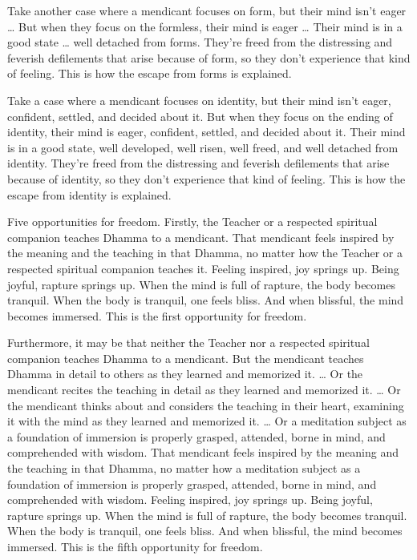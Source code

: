 \documentclass[12pt,openany]{book}%
\begin{document}
Take another case where a mendicant focuses on form, but their mind isn’t eager … But when they focus on the formless, their mind is eager … Their mind is in a good state … well detached from forms. They’re freed from the distressing and feverish defilements that arise because of form, so they don’t experience that kind of feeling. This is how the escape from forms is explained. 

Take a case where a mendicant focuses on identity, but their mind isn’t eager, confident, settled, and decided about it. But when they focus on the ending of identity, their mind is eager, confident, settled, and decided about it. Their mind is in a good state, well developed, well risen, well freed, and well detached from identity. They’re freed from the distressing and feverish defilements that arise because of identity, so they don’t experience that kind of feeling. This is how the escape from identity is explained. 

Five opportunities for freedom. Firstly, the Teacher or a respected spiritual companion teaches Dhamma to a mendicant. That mendicant feels inspired by the meaning and the teaching in that Dhamma, no matter how the Teacher or a respected spiritual companion teaches it. Feeling inspired, joy springs up. Being joyful, rapture springs up. When the mind is full of rapture, the body becomes tranquil. When the body is tranquil, one feels bliss. And when blissful, the mind becomes immersed. This is the first opportunity for freedom. 

Furthermore, it may be that neither the Teacher nor a respected spiritual companion teaches Dhamma to a mendicant. But the mendicant teaches Dhamma in detail to others as they learned and memorized it. … Or the mendicant recites the teaching in detail as they learned and memorized it. … Or the mendicant thinks about and considers the teaching in their heart, examining it with the mind as they learned and memorized it. … Or a meditation subject as a foundation of immersion is properly grasped, attended, borne in mind, and comprehended with wisdom. That mendicant feels inspired by the meaning and the teaching in that Dhamma, no matter how a meditation subject as a foundation of immersion is properly grasped, attended, borne in mind, and comprehended with wisdom. Feeling inspired, joy springs up. Being joyful, rapture springs up. When the mind is full of rapture, the body becomes tranquil. When the body is tranquil, one feels bliss. And when blissful, the mind becomes immersed. This is the fifth opportunity for freedom. 
\end{document}

